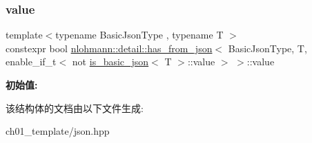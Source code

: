 \subsubsection{\texorpdfstring{value}{value}}
{\footnotesize\ttfamily template$<$typename Basic\+Json\+Type , typename T $>$ \\
constexpr bool \mbox{\hyperlink{structnlohmann_1_1detail_1_1has__from__json}{nlohmann\+::detail\+::has\+\_\+from\+\_\+json}}$<$ Basic\+Json\+Type, T, enable\+\_\+if\+\_\+t$<$ not \mbox{\hyperlink{structnlohmann_1_1detail_1_1is__basic__json}{is\+\_\+basic\+\_\+json}}$<$ T $>$\+::value $>$ $>$\+::value\hspace{0.3cm}{\ttfamily [static]}}

{\bfseries 初始值\+:}
\begin{DoxyCode}{0}
\DoxyCodeLine{=}

\end{DoxyCode}


该结构体的文档由以下文件生成\+:\begin{DoxyCompactItemize}
\item 
ch01\+\_\+template/json.\+hpp\end{DoxyCompactItemize}
